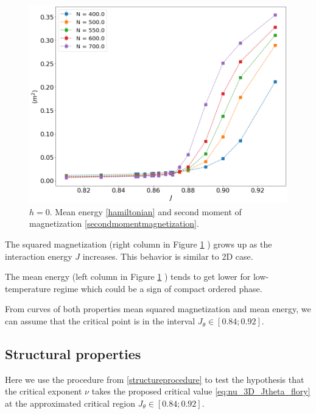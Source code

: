 \begin{figure}[t]
	\includegraphics[scale=0.23]{Images/3_magnetization2_longchains.png}
	\caption{$h=0$. Mean energy \eqref{hamiltonian} and   second moment of magnetization \eqref{secondmomentmagnetization}. }
	\label{fig:energymagshort_3D}
\end{figure}

The squared magnetization (right column in Figure \ref{fig:energymagshort_3D} ) grows up as the interaction energy $J$ increases. This behavior is similar to 2D case. 

The mean energy (left column in Figure \ref{fig:energymagshort_3D} ) tends to get lower for low-temperature regime which could be a sign of compact ordered phase. 

From curves of both properties mean squared magnetization and mean energy, we can assume that the critical point is in the interval $J_{\theta} \in [0.84; 0.92]$.

\subsection{Structural properties}

Here we use the procedure from \ref{structureprocedure} to test the hypothesis that the critical exponent $\nu$ takes the proposed critical value \eqref{eq:nu_3D_Jtheta_flory} at the approximated critical region $J_{\theta} \in [0.84; 0.92]$. 

